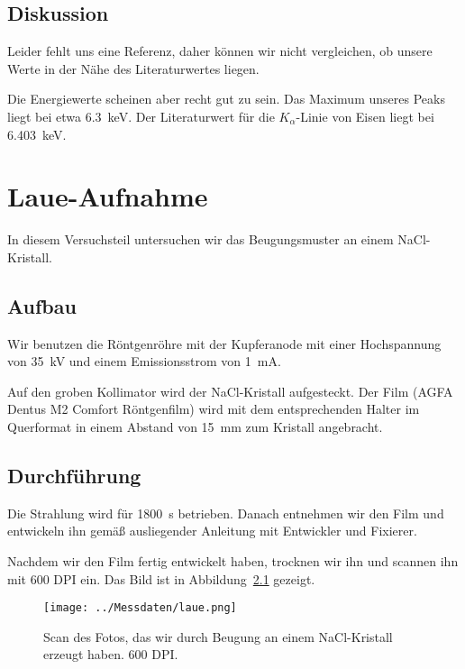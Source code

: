 \section{Diskussion}

Leider fehlt uns eine Referenz, daher können wir nicht vergleichen, ob unsere
Werte in der Nähe des Literaturwertes liegen.

Die Energiewerte scheinen aber recht gut zu sein. Das Maximum unseres Peaks
liegt bei etwa \SI{6.3}{\kilo\electronvolt}. Der Literaturwert für die
$K_\alpha$-Linie von Eisen liegt bei \SI{6.403}{\kilo\electronvolt}.
\parencite{x-ray_data_booklet}

\chapter{Laue-Aufnahme}

In diesem Versuchsteil untersuchen wir das Beugungsmuster an einem
NaCl-Kristall.

\section{Aufbau}

Wir benutzen die Röntgenröhre mit der Kupferanode mit einer Hochspannung von
\SI{35}{\kilo\volt} und einem Emissionsstrom von \SI{1}{\milli\ampere}.

Auf den groben Kollimator wird der NaCl-Kristall aufgesteckt. Der Film (AGFA
Dentus M2 Comfort Röntgenfilm) wird mit dem entsprechenden Halter im Querformat
in einem Abstand von \SI{15}{\milli\meter} zum Kristall angebracht.

\section{Durchführung}

Die Strahlung wird für \SI{1800}{\second} betrieben. Danach entnehmen wir den
Film und entwickeln ihn gemäß ausliegender Anleitung mit Entwickler und
Fixierer.

Nachdem wir den Film fertig entwickelt haben, trocknen wir ihn und scannen
ihn mit 600 DPI ein. Das Bild ist in Abbildung~\ref{fig:laue} gezeigt.

\begin{figure}[htbp]
    \centering
    \texttt{[image: ../Messdaten/laue.png]}
    \caption{%
        Scan des Fotos, das wir durch Beugung an einem NaCl-Kristall erzeugt
        haben. 600 DPI.
    }
    \label{fig:laue}
\end{figure}

